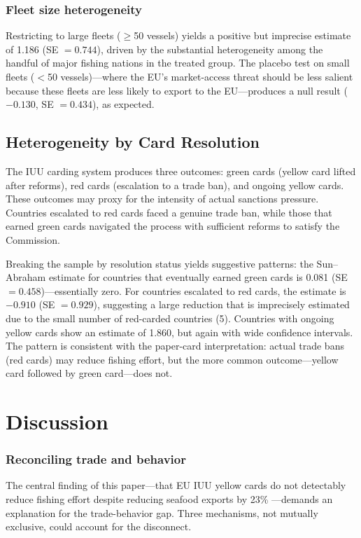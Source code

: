 \documentclass[12pt]{article}
\begin{document}
\subsubsection*{Fleet size heterogeneity} Restricting to large fleets ($\geq$50 vessels) yields a positive but imprecise estimate of 1.186 (SE $= 0.744$), driven by the substantial heterogeneity among the handful of major fishing nations in the treated group. The placebo test on small fleets ($<$50 vessels)---where the EU's market-access threat should be less salient because these fleets are less likely to export to the EU---produces a null result ($-0.130$, SE $= 0.434$), as expected.



\subsection{Heterogeneity by Card Resolution}

The IUU carding system produces three outcomes: green cards (yellow card lifted after reforms), red cards (escalation to a trade ban), and ongoing yellow cards. These outcomes may proxy for the intensity of actual sanctions pressure. Countries escalated to red cards faced a genuine trade ban, while those that earned green cards navigated the process with sufficient reforms to satisfy the Commission.

Breaking the sample by resolution status yields suggestive patterns: the Sun--Abraham estimate for countries that eventually earned green cards is 0.081 (SE $= 0.458$)---essentially zero. For countries escalated to red cards, the estimate is $-0.910$ (SE $= 0.929$), suggesting a large reduction that is imprecisely estimated due to the small number of red-carded countries (5). Countries with ongoing yellow cards show an estimate of 1.860, but again with wide confidence intervals. The pattern is consistent with the paper-card interpretation: actual trade bans (red cards) may reduce fishing effort, but the more common outcome---yellow card followed by green card---does not.


\section{Discussion}
\label{sec:discussion}

\subsubsection*{Reconciling trade and behavior} The central finding of this paper---that EU IUU yellow cards do not detectably reduce fishing effort despite reducing seafood exports by 23\% \citep{vatsov2023trade}---demands an explanation for the trade-behavior gap. Three mechanisms, not mutually exclusive, could account for the disconnect.
\end{document}

